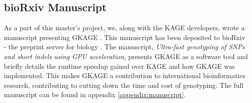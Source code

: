 \subsection{bioRxiv Manuscript}
As a part of this master's project, we, along with the KAGE developers, wrote a manuscript presenting GKAGE \cite{manuscript}.
This manuscript has been deposited to bioRxiv - the preprint server for biology \cite{biorxiv}.
The manuscript, \textit{Ultra-fast genotyping of SNPs and short indels using GPU acceleration}, presents GKAGE as a software tool and briefly details the runtime speedup gained over KAGE and how GKAGE was implemented.
This makes GKAGE a contribution to international bioinformatics research, contributing to cutting down the time and cost of genotyping.
The full manuscript can be found in appendix \ref{appendix:manuscript}.
